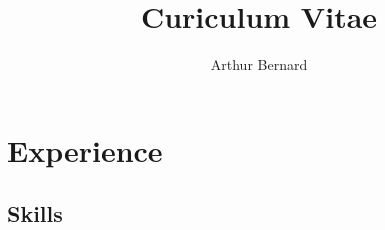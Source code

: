 \documentclass[a4paper,11pt]{arthur-cv}
\title{Curiculum Vitae}
\author{Arthur Bernard}
\begin{document}
\makeprofile %

\section{Experience}

\subsection{Skills}
\end{document}
